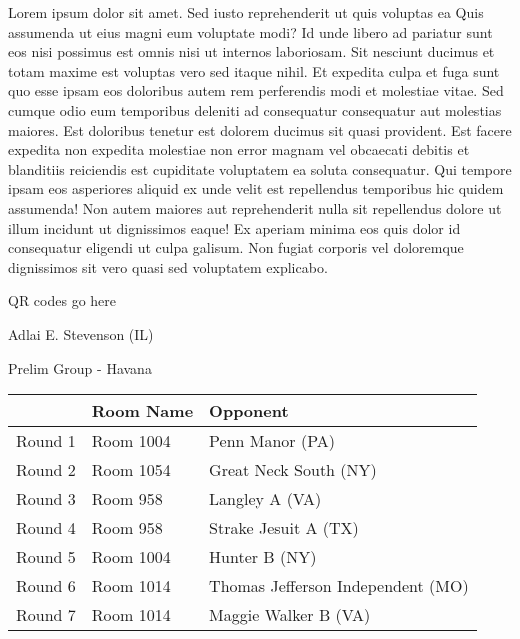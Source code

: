 \documentclass{article}%
\begin{document}
\vspace*{8pt}%
\linebreak%
\newline%
\newline%
Lorem ipsum dolor sit amet. Sed iusto reprehenderit ut quis voluptas ea Quis assumenda ut eius magni eum voluptate modi? Id unde libero ad pariatur sunt eos nisi possimus est omnis nisi ut internos laboriosam. Sit nesciunt ducimus et totam maxime est voluptas vero sed itaque nihil. Et expedita culpa et fuga sunt quo esse ipsam eos doloribus autem rem perferendis modi et molestiae vitae.\newline%
\newline%
Sed cumque odio eum temporibus deleniti ad consequatur consequatur aut molestias maiores. Est doloribus tenetur est dolorem ducimus sit quasi provident. Est facere expedita non expedita molestiae non error magnam vel obcaecati debitis et blanditiis reiciendis est cupiditate voluptatem ea soluta consequatur. Qui tempore ipsam eos asperiores aliquid ex unde velit est repellendus temporibus hic quidem assumenda!\newline%
\newline%
Non autem maiores aut reprehenderit nulla sit repellendus dolore ut illum incidunt ut dignissimos eaque! Ex aperiam minima eos quis dolor id consequatur eligendi ut culpa galisum. Non fugiat corporis vel doloremque dignissimos sit vero quasi sed voluptatem explicabo.\newline%
\newline%
%
\vspace*{30pt}%
\begin{center}%
\begin{Huge}%
QR codes go here%
\end{Huge}%
\end{center}%
\newpage%
%
\begin{center}%
\begin{Huge}%
Adlai E. Stevenson (IL)%
\end{Huge}%
\vspace*{8pt}%
\linebreak%
\begin{Large}%
Prelim Group {-} Havana%
\end{Large}%
\end{center}%
\begin{tabularx}{\textwidth}{|c|Y|Y|}%
\hline%
&Room Name&Opponent\\%
\hline%
Round 1&Room 1004&Penn Manor (PA)\\%
Round 2&Room 1054&Great Neck South (NY)\\%
Round 3&Room 958&Langley A (VA)\\%
Round 4&Room 958&Strake Jesuit A (TX)\\%
Round 5&Room 1004&Hunter B (NY)\\%
Round 6&Room 1014&Thomas Jefferson Independent (MO)\\%
Round 7&Room 1014&Maggie Walker B (VA)\\%
\hline%
\end{tabularx}%
\end{document}
